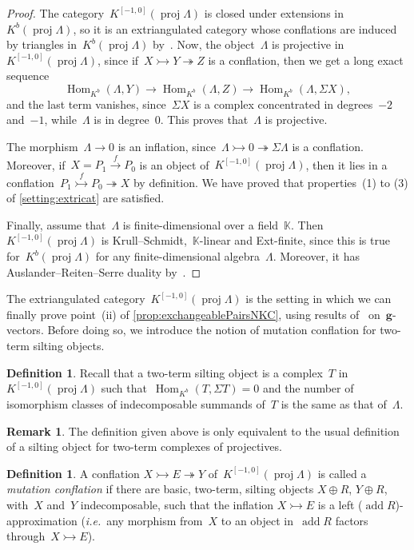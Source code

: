 \documentclass{amsart}
\theoremstyle{definition}
\newtheorem{definition}[theorem]{Definition}
\newtheorem{remark}[theorem]{Remark}
\renewcommand{\b}[1]{{\boldsymbol{#1}}} %
\newcommand{\ie}{\textit{i.e.}~} %
\newcommand{\darkblue}{\color{darkblue}} %
\newcommand{\defn}[1]{\textsl{\darkblue #1}} %
\newcommand{\field}{\mathbb{K}}
\newcommand{\Hom}[1]{\operatorname{Hom}_{#1}}
\newcommand{\susp}{\Sigma}
\newcommand{\add}{\operatorname{add}}
\newcommand{\proj}{\operatorname{proj}}
\newcommand{\infl}{\rightarrowtail}
\newcommand{\defl}{\twoheadrightarrow}
\begin{document}
\begin{proof}
The category~$K^{[-1,0]}(\proj \Lambda)$ is closed under extensions in~$K^b(\proj \Lambda)$, so it is an extriangulated category whose conflations are induced by triangles in~$K^b(\proj\Lambda)$ by~\cite[Rem.~2.18]{NakaokaPalu}. Now, the object~$\Lambda$ is projective in~$K^{[-1,0]}(\proj \Lambda)$, since if~$X\infl Y\defl Z$ is a conflation, then we get a long exact sequence
\[
\Hom{K^b}(\Lambda,Y)\to \Hom{K^b}(\Lambda,Z) \to  \Hom{K^b}(\Lambda, \susp X),
\]
and the last term vanishes, since~$\susp X$ is a complex concentrated in degrees~$-2$ and~$-1$, while~$\Lambda$ is in degree~$0$. This proves that~$\Lambda$ is projective.
 
The morphism~$\Lambda \to 0$ is an inflation, since~$\Lambda\infl 0 \defl \susp \Lambda$ is a conflation. Moreover, if~$X= P_1\xrightarrow{f}P_0$ is an object of~$K^{[-1,0]}(\proj\Lambda)$, then it lies in a conflation~$P_1\stackrel{f}{\infl} P_0 \defl X$ by definition. We have proved that properties~(1) to (3) of \cref{setting:extricat} are satisfied.
 
Finally, assume that~$\Lambda$ is finite-dimensional over a field~$\field$. Then~$K^{[-1,0]}(\proj\Lambda)$ is Krull--Schmidt,~$\field$-linear and Ext-finite, since this is true for~$K^b(\proj\Lambda)$ for any finite-dimensional algebra~$\Lambda$. Moreover, it has Auslander--Reiten--Serre duality by~\cite[Prop.~6.1]{IyamaNakaokaPalu}.
\end{proof}

The extriangulated category~$K^{[-1,0]}(\proj \Lambda)$ is the setting in which we can finally prove point~(ii) of \cref{prop:exchangeablePairsNKC}, using results of~\cite{DemonetIyamaJasso} on~$\b{g}$-vectors. 
Before doing so, we introduce the notion of mutation conflation for two-term silting objects.

\begin{definition}
Recall that a two-term silting object is a complex~$T$ in~$K^{[-1,0]}(\proj \Lambda)$ such that~$\Hom{K^b}(T,\susp T)=0$ and the number of isomorphism classes of indecomposable summands of~$T$ is the same as that of~$\Lambda$.
\end{definition}

\begin{remark}
The definition given above is only equivalent to the usual definition of a silting object for two-term complexes of projectives.
\end{remark}

\begin{definition}
\label{def:mutation conflation}
A conflation $X\infl E\defl Y$ of~$K^{[-1,0]}(\proj \Lambda)$ is called a \defn{mutation conflation} if there are basic, two-term, silting objects $X\oplus R$, $Y\oplus R$, with~$X$ and~$Y$ indecomposable, such that the inflation $X\infl E$ is a left ($\add R$)-approximation (\ie any morphism from~$X$ to an object in~$\add R$ factors through~$X\infl E$).
\end{definition}
\end{document}
